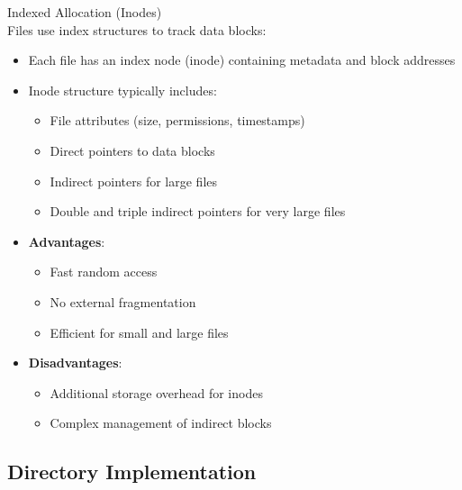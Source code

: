 \begin{definition}{Indexed Allocation (Inodes)}\\
    Files use index structures to track data blocks:
    \begin{itemize}
        \item Each file has an index node (inode) containing metadata and block addresses
        \item Inode structure typically includes:
            \begin{itemize}
                \item File attributes (size, permissions, timestamps)
                \item Direct pointers to data blocks
                \item Indirect pointers for large files
                \item Double and triple indirect pointers for very large files
            \end{itemize}
        \item \textbf{Advantages}:
            \begin{itemize}
                \item Fast random access
                \item No external fragmentation
                \item Efficient for small and large files
            \end{itemize}
        \item \textbf{Disadvantages}:
            \begin{itemize}
                \item Additional storage overhead for inodes
                \item Complex management of indirect blocks
            \end{itemize}
    \end{itemize}
\end{definition}

\subsection{Directory Implementation}

